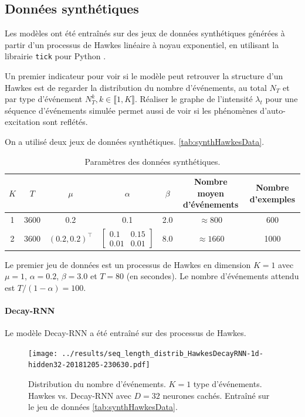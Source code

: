 \documentclass[../main.tex]{subfiles}
\begin{document}
\subsection{Données synthétiques}\label{ssec:synthResults}

Les modèles ont été entraînés sur des jeux de données synthétiques générées à partir d'un processus de Hawkes linéaire à noyau exponentiel, en utilisant la librairie \verb|tick| pour Python \cite{2017arXiv170703003B}.

Un premier indicateur pour voir si le modèle peut retrouver la structure d'un Hawkes est de regarder la distribution du nombre d'événements, au total $N_T$ et par type d'événement $N^k_T, k\in\llbracket 1,K\rrbracket$. Réaliser le graphe de l'intensité $\lambda_t$ pour une séquence d'événements simulée permet aussi de voir si les phénomènes d'auto-excitation sont reflétés.

On a utilisé deux jeux de données synthétiques. \autoref{tab:synthHawkesData}.

\begin{table}[h]
	\centering
	\begin{tabular}[]{ccccccc}
		\toprule
		$K$ & $T$ & $\mu$ & $\alpha$ & $\beta$ & Nombre moyen d'événements & Nombre d'exemples\\ \midrule
		1 & 3600 & 0.2 & 0.1 & 2.0 & $\approx 800$ & 600 \\\hline
		2 & 3600 & $(0.2, 0.2)^\intercal$ & $\begin{bmatrix}0.1 & 0.15\\0.01&0.01\end{bmatrix}$ & 8.0 & $\approx 1660$ & 1000
	\end{tabular}
	\caption{Paramètres des données synthétiques.}\label{tab:synthHawkesData}
\end{table}

Le premier jeu de données est un processus de Hawkes en dimension $K=1$ avec $\mu=1$, $\alpha = \num{0.2}$, $\beta = \num{3.0}$ et $T = \num{80}$ (en secondes). Le nombre d'événements attendu est $T/(1-\alpha) = \num{100}$.

\paragraph{Decay-RNN} Le modèle Decay-RNN a été entraîné sur des processus de Hawkes.



\begin{figure}[ht]
	\texttt{[image: ../results/seq\_length\_distrib\_HawkesDecayRNN-1d-hidden32-20181205-230630.pdf]}
	\caption{Distribution du nombre d'événements. $K=1$ type d'événements. Hawkes vs. Decay-RNN avec $D=32$ neurones cachés. Entraîné sur le jeu de données \autoref{tab:synthHawkesData}.}\label{fig:1DRNNlengthDistrib}
\end{figure}
\end{document}
